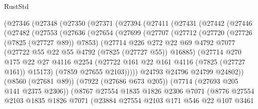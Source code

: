 \begin{lexlean}{RustStd}
\begin{coremodule}
    (@27346
      (@27348
        (@27350
          (@27371
            (@27394
              (@27411
                (@27431
                  (@27442
                    (@27446
                      (@27482
                        (@27553
                          (@27636
                            (@27654
                              (@27699
                                (@27707
                                  (@27712
                                    (@27720
                                      (@27726 (@7825 (@27727 @89)) @7853)
                                      (@27714
                                        @226
                                        @272
                                        @22
                                        @69
                                        @4792
                                        @7077
                                        (@27722 @55 @22 @55 @4792 (@7825 (@27727 @55)) @16885)
                                        (@27714
                                          @270
                                          @175
                                          @22
                                          @27
                                          @4116
                                          @2254
                                          (@27722 @161 @22 @161 @4116 (@7825 (@27727 @161)) @15173)
                                          (@7859 @27655 @2103)))))
                                  @24793
                                  @24796
                                  @24799
                                  @24802))
                              (@8560 (@27681 @89))
                              (@7922 (@27686 @673 @205))
                              (@7714 (@27693 @205 @141 @2375 @2306))
                              (@8767
                                @27554
                                @1835
                                @1826
                                @2306
                                @7071
                                (@8776
                                  @27554
                                  @2103
                                  @1835
                                  @1826
                                  @7071
                                  (@23884
                                    @27554
                                    @2103
                                    @171
                                    @546
                                    @22
                                    @107
                                    @3461

\end{coremodule}
\end{lexlean}
